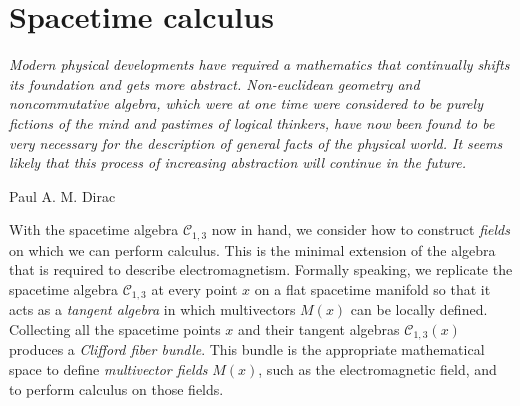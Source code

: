 \documentclass[1p,sort&compress]{elsarticle}
\numberwithin{equation}{section}
\newcommand\epigraph[3]{
\vspace{1em}\hfill{}\begin{minipage}{#1}{\begin{spacing}{0.9}
\small\noindent\textit{#2}\end{spacing}
\vspace{1em}
\hfill{}{#3}}\vspace{2em}
\end{minipage}}
\begin{document}

\section{Spacetime calculus}\label{sec:calculus}

\epigraph{4.5in}{%
Modern physical developments have required a mathematics that continually shifts its foundation and gets more abstract. 
Non-euclidean geometry and noncommutative algebra, which were at one time were considered to be purely fictions of the mind and pastimes of logical thinkers, have now been found to be very necessary for the description of general facts of the physical world. 
It seems likely that this process of increasing abstraction will continue in the future. 
}{Paul A. M. Dirac \cite{Dirac1931}}


With the spacetime algebra $\mathcal{C}_{1,3}$ now in hand, we consider how to construct \emph{fields} on which we can perform calculus.  This is the minimal extension of the algebra that is required to describe electromagnetism.  Formally speaking, we replicate the spacetime algebra $\mathcal{C}_{1,3}$ at every point $x$ on a flat spacetime manifold so that it acts as a \emph{tangent algebra} in which multivectors $M(x)$ can be locally defined.  Collecting all the spacetime points $x$ and their tangent algebras $\mathcal{C}_{1,3}(x)$ produces a \emph{Clifford fiber bundle}.  This bundle is the appropriate mathematical space to define \emph{multivector fields} $M(x)$, such as the electromagnetic field, and to perform calculus on those fields.  
\end{document}

